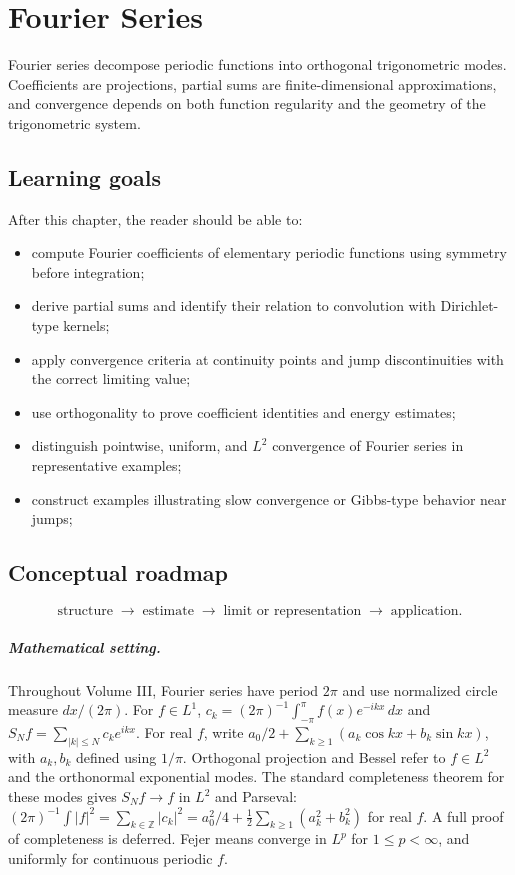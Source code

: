 \chapter{Fourier Series}
\label{ch:iii09}

Fourier series decompose periodic functions into orthogonal trigonometric modes. Coefficients are projections, partial sums are finite-dimensional approximations, and convergence depends on both function regularity and the geometry of the trigonometric system.

\section*{Learning goals}
After this chapter, the reader should be able to:
\begin{itemize}
\item compute Fourier coefficients of elementary periodic functions using symmetry before integration;
\item derive partial sums and identify their relation to convolution with Dirichlet-type kernels;
\item apply convergence criteria at continuity points and jump discontinuities with the correct limiting value;
\item use orthogonality to prove coefficient identities and energy estimates;
\item distinguish pointwise, uniform, and \(L^2\) convergence of Fourier series in representative examples;
\item construct examples illustrating slow convergence or Gibbs-type behavior near jumps;
\end{itemize}
\section*{Conceptual roadmap}
\[
\boxed{\text{structure}\;\longrightarrow\;\text{estimate}\;\longrightarrow\;\text{limit or representation}\;\longrightarrow\;\text{application}.}
\]

\paragraph{Mathematical setting.}
Throughout Volume III, Fourier series have period $2\pi$ and use normalized circle measure $dx/(2\pi)$. For $f\in L^1$, $c_k=(2\pi)^{-1}\int_{-\pi}^{\pi}f(x)e^{-ikx}\,dx$ and $S_Nf=\sum_{|k|\le N}c_ke^{ikx}$. For real $f$, write $a_0/2+\sum_{k\ge1}(a_k\cos kx+b_k\sin kx)$, with $a_k,b_k$ defined using $1/\pi$. Orthogonal projection and Bessel refer to $f\in L^2$ and the orthonormal exponential modes. The standard completeness theorem for these modes gives $S_Nf\to f$ in $L^2$ and Parseval: $(2\pi)^{-1}\int|f|^2=\sum_{k\in\mathbb Z}|c_k|^2=a_0^2/4+\tfrac12\sum_{k\ge1}(a_k^2+b_k^2)$ for real $f$. A full proof of completeness is deferred. Fejer means converge in $L^p$ for $1\le p<\infty$, and uniformly for continuous periodic $f$.

